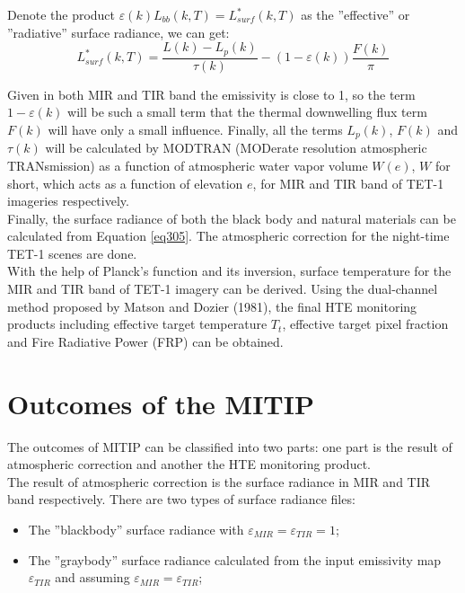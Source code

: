 \noindent Denote the product $\varepsilon(k) L_{bb}(k, T) = L_{surf}^*(k, T)$ as the ''effective'' or ''radiative'' surface radiance, we can get:
\begin{equation}
\label{eq305}
L_{surf}^*(k, T) = \frac{L(k) - L_p(k)}{\tau (k)} - (1 - \varepsilon (k)) \frac{F(k)}{\pi}
\end{equation}

\noindent Given in both MIR and TIR band the emissivity is close to 1, so the term $1 - \varepsilon (k)$ will be such a small term that the thermal downwelling flux term $F(k)$ will have only a small influence. Finally, all the terms $L_p(k)$, $F(k)$ and $\tau (k)$ will be calculated by MODTRAN (MODerate resolution atmospheric TRANsmission) as a function of atmospheric water vapor volume $W(e)$, $W$ for short, which acts as a function of elevation $e$, for MIR and TIR band of TET-1 imageries respectively.\\

\noindent Finally, the surface radiance of both the black body and natural materials can be calculated from Equation \eqref{eq305}. The atmospheric correction for the night-time TET-1 scenes are done.\\

\noindent With the help of Planck's function and its inversion, surface temperature for the MIR and TIR band of TET-1 imagery can be derived. Using the dual-channel method proposed by Matson and Dozier (1981), the final HTE monitoring products including effective target temperature $T_t$, effective target pixel fraction and Fire Radiative Power (FRP) can be obtained.\\


\section{Outcomes of the MITIP}
The outcomes of MITIP can be classified into two parts: one part is the result of atmospheric correction and another the HTE monitoring product.\\

\noindent The result of atmospheric correction is the surface radiance in MIR and TIR band respectively. There are two types of surface radiance files:
\begin{itemize}
\item The ''blackbody'' surface radiance with $\varepsilon_{MIR} = \varepsilon_{TIR} = 1$;
\item The ''graybody'' surface radiance calculated from the input emissivity map $\varepsilon_{TIR}$ and assuming $\varepsilon_{MIR} = \varepsilon_{TIR}$;
\end{itemize}

